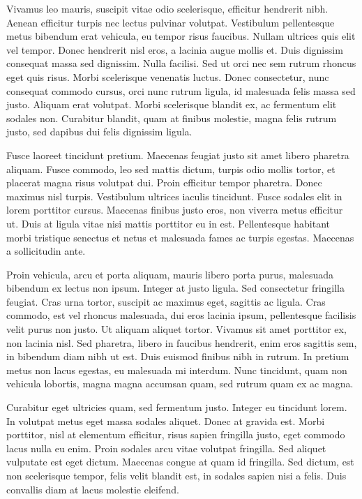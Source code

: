 Vivamus leo mauris, suscipit vitae odio scelerisque, efficitur hendrerit nibh. Aenean efficitur turpis nec lectus pulvinar volutpat. Vestibulum pellentesque metus bibendum erat vehicula, eu tempor risus faucibus. Nullam ultrices quis elit vel tempor. Donec hendrerit nisl eros, a lacinia augue mollis et. Duis dignissim consequat massa sed dignissim. Nulla facilisi. Sed ut orci nec sem rutrum rhoncus eget quis risus. Morbi scelerisque venenatis luctus. Donec consectetur, nunc consequat commodo cursus, orci nunc rutrum ligula, id malesuada felis massa sed justo. Aliquam erat volutpat. Morbi scelerisque blandit ex, ac fermentum elit sodales non. Curabitur blandit, quam at finibus molestie, magna felis rutrum justo, sed dapibus dui felis dignissim ligula.

Fusce laoreet tincidunt pretium. Maecenas feugiat justo sit amet libero pharetra aliquam. Fusce commodo, leo sed mattis dictum, turpis odio mollis tortor, et placerat magna risus volutpat dui. Proin efficitur tempor pharetra. Donec maximus nisl turpis. Vestibulum ultrices iaculis tincidunt. Fusce sodales elit in lorem porttitor cursus. Maecenas finibus justo eros, non viverra metus efficitur ut. Duis at ligula vitae nisi mattis porttitor eu in est. Pellentesque habitant morbi tristique senectus et netus et malesuada fames ac turpis egestas. Maecenas a sollicitudin ante.

Proin vehicula, arcu et porta aliquam, mauris libero porta purus, malesuada bibendum ex lectus non ipsum. Integer at justo ligula. Sed consectetur fringilla feugiat. Cras urna tortor, suscipit ac maximus eget, sagittis ac ligula. Cras commodo, est vel rhoncus malesuada, dui eros lacinia ipsum, pellentesque facilisis velit purus non justo. Ut aliquam aliquet tortor. Vivamus sit amet porttitor ex, non lacinia nisl. Sed pharetra, libero in faucibus hendrerit, enim eros sagittis sem, in bibendum diam nibh ut est. Duis euismod finibus nibh in rutrum. In pretium metus non lacus egestas, eu malesuada mi interdum. Nunc tincidunt, quam non vehicula lobortis, magna magna accumsan quam, sed rutrum quam ex ac magna.

Curabitur eget ultricies quam, sed fermentum justo. Integer eu tincidunt lorem. In volutpat metus eget massa sodales aliquet. Donec at gravida est. Morbi porttitor, nisl at elementum efficitur, risus sapien fringilla justo, eget commodo lacus nulla eu enim. Proin sodales arcu vitae volutpat fringilla. Sed aliquet vulputate est eget dictum. Maecenas congue at quam id fringilla. Sed dictum, est non scelerisque tempor, felis velit blandit est, in sodales sapien nisi a felis. Duis convallis diam at lacus molestie eleifend. 

